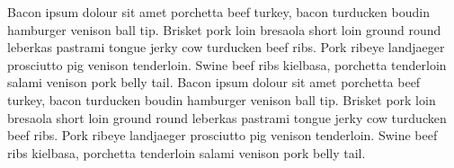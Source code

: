 Bacon ipsum dolour sit amet porchetta beef turkey, bacon turducken boudin hamburger venison ball tip. Brisket pork loin bresaola short loin ground round leberkas pastrami tongue jerky cow turducken beef ribs. Pork ribeye landjaeger prosciutto pig venison tenderloin. Swine beef ribs kielbasa, porchetta tenderloin salami venison pork belly tail.
Bacon ipsum dolour sit amet porchetta beef turkey, bacon turducken boudin hamburger venison ball tip. Brisket pork loin bresaola short loin ground round leberkas pastrami tongue jerky cow turducken beef ribs. Pork ribeye landjaeger prosciutto pig venison tenderloin. Swine beef ribs kielbasa, porchetta tenderloin salami venison pork belly tail.
